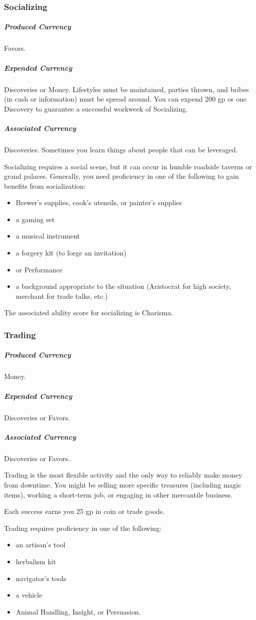 \subsubsection{Socializing}
\subparagraph*{Produced Currency} Favors.
\subparagraph*{Expended Currency} Discoveries or Money. Lifestyles must be maintained, parties thrown, and bribes (in cash or information) must be spread around. You can expend 200 gp or one Discovery to guarantee a successful workweek of Socializing. 
\subparagraph*{Associated Currency} Discoveries. Sometimes you learn things about people that can be leveraged.

Socializing requires a social scene, but it can occur in humble roadside taverns or grand palaces. Generally, you need proficiency in one of the following to gain benefits from socialization:
\begin{itemize}
  \item Brewer's supplies, cook's utensils, or painter's supplies
  \item a gaming set
  \item a musical instrument
  \item a forgery kit (to forge an invitation)
  \item or Performance
  \item a background appropriate to the situation (Aristocrat for high society, merchant for trade talks, etc.)
\end{itemize}

The associated ability score for socializing is Charisma.

\subsubsection{Trading}
\subparagraph*{Produced Currency} Money.
\subparagraph*{Expended Currency} Discoveries or Favors. 
\subparagraph*{Associated Currency} Discoveries or Favors.

Trading is the most flexible activity and the only way to reliably make money from downtime. You might be selling more specific treasures (including magic items), working a short-term job, or engaging in other mercantile business.

Each success earns you 25 gp in coin or trade goods.

Trading requires proficiency in one of the following:
\begin{itemize}
  \item an artisan's tool
  \item herbalism kit
  \item navigator's tools
  \item a vehicle
  \item Animal Handling, Insight, or Persuasion.
\end{itemize}

